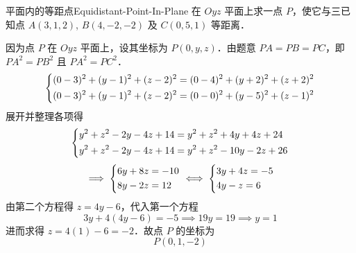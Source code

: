 \begin{problem}{平面内的等距点}{Equidistant-Point-In-Plane}
    在 $Oyz$ 平面上求一点 $P$，使它与三已知点 $A(3, 1, 2)$, $B(4, -2, -2)$ 及 $C(0, 5, 1)$ 等距离．
\end{problem}

\begin{solution}
    因为点 $P$ 在 $Oyz$ 平面上，设其坐标为 $P(0, y, z)$．由题意 $PA = PB = PC$，即 $PA^2 = PB^2$ 且 $PA^2 = PC^2$．
    \begin{equation}
        \begin{dcases}
            (0 - 3)^2 + (y - 1)^2 + (z - 2)^2 = (0 - 4)^2 + (y + 2)^2 + (z + 2)^2 \\
            (0 - 3)^2 + (y - 1)^2 + (z - 2)^2 = (0 - 0)^2 + (y - 5)^2 + (z - 1)^2
        \end{dcases}
    \end{equation}
    展开并整理各项得
    \begin{equation}
        \begin{dcases}
            y^2 + z^2 - 2y - 4z + 14 = y^2 + z^2 + 4y + 4z + 24 \\
            y^2 + z^2 - 2y - 4z + 14 = y^2 + z^2 - 10y - 2z + 26
        \end{dcases}
    \end{equation}
    \begin{equation}
        \implies
        \begin{dcases}
            6y + 8z = -10 \\
            8y - 2z = 12
        \end{dcases}
        \iff
        \begin{dcases}
            3y + 4z = -5 \\
            4y - z = 6
        \end{dcases}
    \end{equation}
    由第二个方程得 $z = 4y - 6$，代入第一个方程
    \begin{equation}
        3y + 4(4y - 6) = -5 \implies 19y = 19 \implies y = 1
    \end{equation}
    进而求得 $z = 4(1) - 6 = -2$．故点 $P$ 的坐标为
    \begin{equation}
        \boxed{P(0, 1, -2)}
    \end{equation}
\end{solution}

\endinput
